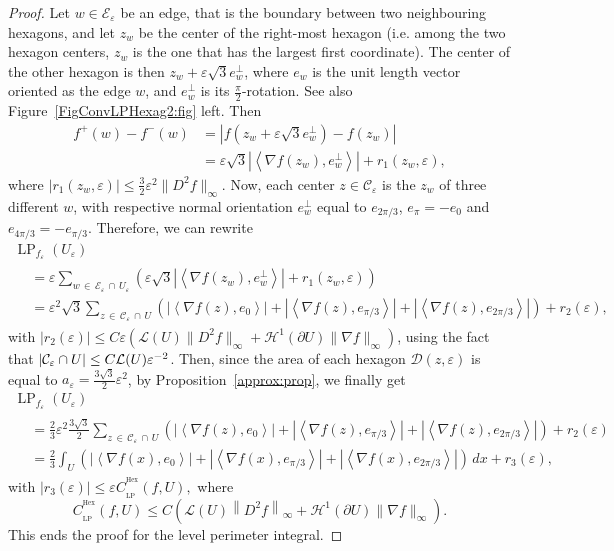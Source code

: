 \documentclass[10pt]{amsart}
\theoremstyle{definition}\newtheorem{defi}[theo]{Definition}\newtheorem{rema}[theo]{Remark}\newtheorem{exam}[theo]{Example}\newtheorem{exem}[theo]{Example}\newtheorem{nota}[theo]{Notation}
\newcommand{\eps}{\varepsilon}
\DeclareMathOperator{\LP}{LP}
\DeclareMathOperator{\Hex}{Hex}
\newcommand{\calH}{\mathcal{H}}
\newcommand{\calL}{\mathcal{L}}
\newcommand{\calC}{\mathcal{C}}
\newcommand{\calD}{\mathcal{D}}
\newcommand{\calE}{\mathcal{E}}
\begin{document}
\begin{proof}
Let $w\in\calE_\eps$ be an edge, that is the boundary between two neighbouring hexagons, and let $z_w$ be the center of the right-most hexagon (i.e. among the two hexagon centers, $z_w$ is the one that has the largest first coordinate). The center of the other hexagon is then $z_w+\eps\sqrt{3} e_w^\perp$, where $e_w$ is the unit length vector oriented as the edge $w$, and $e_w^\perp$ is its $\frac{\pi}{2}$-rotation. See also Figure~\ref{FigConvLPHexag2:fig} left. Then
\begin{align*}
f^+(w) - f^-(w) & = \left| f\left(z_w+\eps\sqrt{3} e_w^\perp\right) - f(z_w)\right|
\\
& = \eps\sqrt{3} \left|\left\langle \nabla f(z_w),e_w^\perp\right\rangle \right| + r_1(z_w,\eps),
\end{align*}
where $|r_1(z_w,\eps)|\leq \tfrac{3}{2}\eps^2 \|D^2 f\|_\infty$. Now, each center $z\in\calC_\eps$ is the $z_w$ of three different $w$, with respective normal orientation $e_w^\perp$ equal to $e_{2\pi/3}$, $e_\pi=-e_0$ and $e_{4\pi/3}=-e_{\pi/3}$. Therefore, we can rewrite
\begin{multline*}
\LP_{f_\eps}(U_\eps) \\
\begin{aligned}
& = \eps \sum_{w\,\in\,\calE_\eps\,\cap\,U_\eps} \left(
\eps\sqrt{3} \left|\left\langle \nabla f(z_w),e_w^\perp\right\rangle \right| + r_1(z_w,\eps) \right) \\
& = \eps^2 \sqrt{3} \sum_{z\,\in\,\calC_\eps\,\cap\,U} \left(\left|\left\langle \nabla f(z),e_0 \right\rangle\right| + \left|\left\langle \nabla f(z),e_{\pi/3} \right\rangle \right| +\left|\left\langle \nabla f(z),e_{2\pi/3} \right\rangle\right|\right) + r_2(\eps),
\end{aligned}
\end{multline*}
with $|r_2(\eps)|\le C\eps \left({\calL}(U) \|D^2 f\|_\infty +{\calH}^1(\partial U)\|\nabla f\|_\infty\right)$, using the fact that $|\calC_\eps\cap U|\linebreak\le C {\calL}(U)
\eps^{-2}$. Then, since the area of each hexagon $\calD(z,\eps)$ is equal to $a_\eps=\frac{3\sqrt{3}}{2}\eps^2$, by Proposition~\ref{approx:prop}, we finally get
\begin{multline*}
\LP_{f_\eps}(U_\eps)\\
\begin{aligned}
& = \frac{2}{3} \eps^2 \frac{3\sqrt{3}}{2} \sum_{z\,\in\,\calC_\eps\,\cap\,U} \left(\left|\left\langle \nabla f(z),e_0 \right\rangle \right| + \left|\left\langle \nabla f(z),e_{\pi/3} \right\rangle\right| +\left|\left\langle \nabla f(z),e_{2\pi/3} \right\rangle\right|\right) + r_2(\eps) \\
& =
\frac{2}{3} \int_U \left(\left|\left\langle
\nabla f(x),e_0\right\rangle\right| +\left|\left\langle \nabla f(x),e_{\pi/3}\right\rangle\right| +\left|\left\langle
\nabla f(x),e_{2\pi/3}\right\rangle\right| \right) \, dx + r_3(\eps),
\end{aligned}
\end{multline*}
with $|r_3(\eps)|\le \eps C_{_{\LP}}^{^{\Hex}}(f,U),$ where
\[
C_{_{\LP}}^{^{\Hex}}(f,U)\le C \left({\calL}(U) \left\|D^2 f\right\|_\infty +{\calH}^1(\partial U)\|\nabla f\|_\infty\right).
\] 
This ends the proof for the level perimeter integral.


\end{proof}
\end{document}
